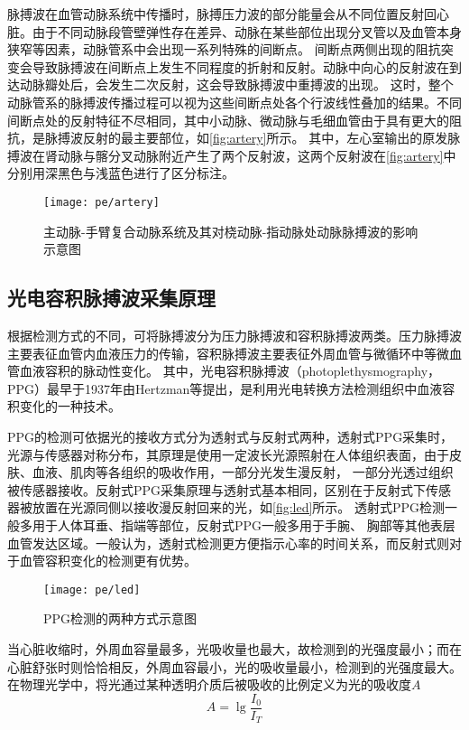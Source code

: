 脉搏波在血管动脉系统中传播时，脉搏压力波的部分能量会从不同位置反射回心脏。由于不同动脉段管壁弹性存在差异、动脉在某些部位出现分叉管以及血管本身狭窄等因素，动脉管系中会出现一系列特殊的间断点。
间断点两侧出现的阻抗突变会导致脉搏波在间断点上发生不同程度的折射和反射。动脉中向心的反射波在到达动脉瓣处后，会发生二次反射，这会导致脉搏波中重搏波的出现。
这时，整个动脉管系的脉搏波传播过程可以视为这些间断点处各个行波线性叠加的结果\cite{THOCBPM}。不同间断点处的反射特征不尽相同，其中小动脉、微动脉与毛细血管由于具有更大的阻抗，是脉搏波反射的最主要部位，如\autoref{fig:artery}所示。
其中，左心室输出的原发脉搏波在肾动脉与髂分叉动脉附近产生了两个反射波，这两个反射波在\autoref{fig:artery}中分别用深黑色与浅蓝色进行了区分标注。
\begin{figure}[htbp]
    \centering
    \texttt{[image: pe/artery]}
    \caption[主动脉-手臂复合动脉系统及其对桡动脉-指动脉处动脉脉搏波的影响示意图]{\label{fig:artery}主动脉-手臂复合动脉系统及其对桡动脉-指动脉处动脉脉搏波的影响示意图\cite{THOCBPM}}
\end{figure}

\subsection{光电容积脉搏波采集原理}
根据检测方式的不同，可将脉搏波分为压力脉搏波和容积脉搏波两类。压力脉搏波主要表征血管内血液压力的传输，容积脉搏波主要表征外周血管与微循环中等微血管血液容积的脉动性变化。
其中，光电容积脉搏波（photoplethysmography，PPG）最早于1937年由Hertzman等\cite{Hertzman1937}提出，是利用光电转换方法检测组织中血液容积变化的一种技术。

PPG的检测可依据光的接收方式分为透射式与反射式两种\cite{THOCBPM}，透射式PPG采集时，光源与传感器对称分布，其原理是使用一定波长光源照射在人体组织表面，由于皮肤、血液、肌肉等各组织的吸收作用，一部分光发生漫反射，
一部分光透过组织被传感器接收。反射式PPG采集原理与透射式基本相同，区别在于反射式下传感器被放置在光源同侧以接收漫反射回来的光\cite{THOCBPM,mmt}，如\autoref{fig:led}所示。
透射式PPG检测一般多用于人体耳垂、指端等部位，反射式PPG一般多用于手腕、
胸部等其他表层血管发达区域\cite{THOCBPM}。一般认为，透射式检测更方便指示心率的时间关系，而反射式则对于血管容积变化的检测更有优势\cite{mmt}。
\begin{figure}[htbp]
    \centering
    \texttt{[image: pe/led]}
    \caption[PPG检测的两种方式示意图]{\label{fig:led}PPG检测的两种方式示意图\cite{THOCBPM}}
\end{figure}

当心脏收缩时，外周血容量最多，光吸收量也最大，故检测到的光强度最小；而在心脏舒张时则恰恰相反，外周血容最小，光的吸收量最小，检测到的光强度最大\cite{lhc,cwl}。
在物理光学中，将光通过某种透明介质后被吸收的比例定义为光的吸收度$A$
\begin{equation}
    \label{equ:LBL}
    A=\lg\frac{I_{0}}{I_{T}}
\end{equation}

